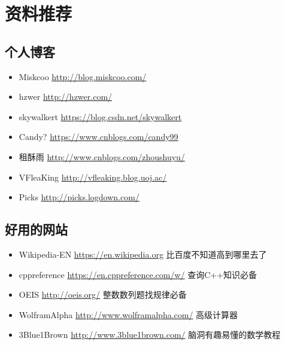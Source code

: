 \chapter{资料推荐}
\section{个人博客}
\begin{itemize}
	\item Miskcoo \url{http://blog.miskcoo.com/}
	\item hzwer \url{http://hzwer.com/}
    \item skywalkert \url{https://blog.csdn.net/skywalkert}
    \item Candy? \url{https://www.cnblogs.com/candy99}
    \item 租酥雨 \url{http://www.cnblogs.com/zhoushuyu/}
    \item VFleaKing \url{http://vfleaking.blog.uoj.ac/}
    \item Picks \url{http://picks.logdown.com/}
\end{itemize}
\section{好用的网站}
\begin{itemize}
    \item Wikipedia-EN \url{https://en.wikipedia.org} 比百度不知道高到哪里去了
    \item cppreference \url{https://en.cppreference.com/w/} 查询C++知识必备
    \item OEIS \url{http://oeis.org/} 整数数列题找规律必备
    \item WolframAlpha \url{http://www.wolframalpha.com/} 高级计算器
    \item 3Blue1Brown \url{http://www.3blue1brown.com/} 脑洞有趣易懂的数学教程
\end{itemize}
